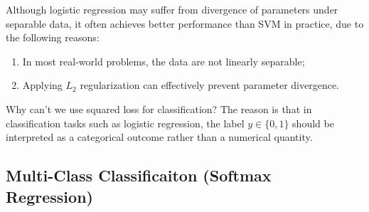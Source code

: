 \documentclass[../main]{subfiles}
\begin{document}
Although logistic regression may suffer from divergence of parameters under separable data, it often achieves better performance than SVM in practice, due to the following reasons:
\begin{enumerate}
  \item In most real-world problems, the data are not linearly separable;
  \item Applying $L_2$ regularization can effectively prevent parameter divergence.
\end{enumerate}
\begin{remark}
  Why can't we use squared loss for classification? The reason is that in classification tasks such as logistic regression, the label $y \in \{0,1\}$ should be interpreted as a categorical outcome rather than a numerical quantity. 
\end{remark}
\vspace{1em}


  \subsection{Multi-Class Classificaiton (Softmax Regression)}
\end{document}
